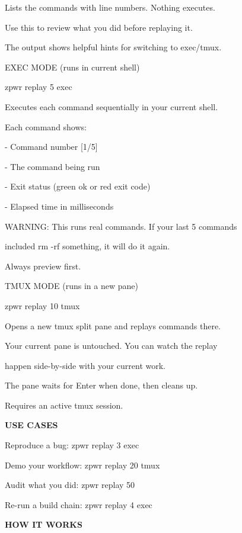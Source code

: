 \documentclass[11pt,a4paper,twoside]{book}
\begin{document}
Lists the commands with line numbers. Nothing executes.

Use this to review what you did before replaying it.

The output shows helpful hints for switching to exec/tmux.

EXEC MODE (runs in current shell)

\begin{codebox}
zpwr replay 5 exec\\
\end{codebox}

Executes each command sequentially in your current shell.

Each command shows:

- Command number [1/5]

- The command being run

- Exit status (green ok or red exit code)

- Elapsed time in milliseconds

WARNING: This runs real commands. If your last 5 commands

included rm -rf something, it will do it again.

Always preview first.

TMUX MODE (runs in a new pane)

\begin{codebox}
zpwr replay 10 tmux\\
\end{codebox}

Opens a new tmux split pane and replays commands there.

Your current pane is untouched. You can watch the replay

happen side-by-side with your current work.

The pane waits for Enter when done, then cleans up.

Requires an active tmux session.


\vspace{12pt}
{\bfseries\color{neonyellow} USE CASES}\vspace{4pt}

Reproduce a bug:       zpwr replay 3 exec

Demo your workflow:     zpwr replay 20 tmux

Audit what you did:     zpwr replay 50

Re-run a build chain:   zpwr replay 4 exec


\vspace{12pt}
{\bfseries\color{neonyellow} HOW IT WORKS}\vspace{4pt}
\end{document}
